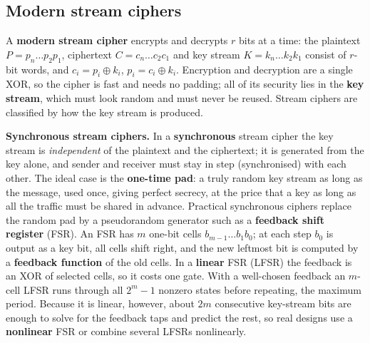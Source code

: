 \subsection{Modern stream ciphers}
A \textbf{modern stream cipher} encrypts and decrypts $r$ bits at a time: the plaintext $P = p_n \dots p_2 p_1$, ciphertext $C = c_n \dots c_2 c_1$ and key stream $K = k_n \dots k_2 k_1$ consist of $r$-bit words, and $c_i = p_i \oplus k_i$, $p_i = c_i \oplus k_i$. Encryption and decryption are a single XOR, so the cipher is fast and needs no padding; all of its security lies in the \textbf{key stream}, which must look random and must never be reused. Stream ciphers are classified by how the key stream is produced.

\textbf{Synchronous stream ciphers.} In a \textbf{synchronous} stream cipher the key stream is \emph{independent} of the plaintext and the ciphertext; it is generated from the key alone, and sender and receiver must stay in step (synchronised) with each other. The ideal case is the \textbf{one-time pad}: a truly random key stream as long as the message, used once, giving perfect secrecy, at the price that a key as long as all the traffic must be shared in advance. Practical synchronous ciphers replace the random pad by a pseudorandom generator such as a \textbf{feedback shift register} (FSR). An FSR has $m$ one-bit cells $b_{m-1} \dots b_1 b_0$; at each step $b_0$ is output as a key bit, all cells shift right, and the new leftmost bit is computed by a \textbf{feedback function} of the old cells. In a \textbf{linear} FSR (LFSR) the feedback is an XOR of selected cells, so it costs one gate. With a well-chosen feedback an $m$-cell LFSR runs through all $2^m - 1$ nonzero states before repeating, the maximum period. Because it is linear, however, about $2m$ consecutive key-stream bits are enough to solve for the feedback taps and predict the rest, so real designs use a \textbf{nonlinear} FSR or combine several LFSRs nonlinearly.

